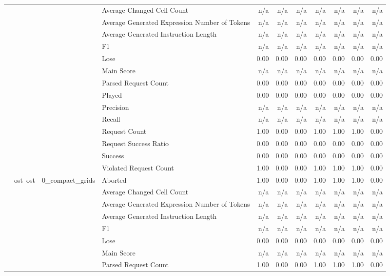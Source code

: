 \begin{tabular}{llllrrrrrrr}
 &  &  & Average Changed Cell Count & n/a & n/a & n/a & n/a & n/a & n/a & n/a \\
 &  &  & Average Generated Expression Number of Tokens & n/a & n/a & n/a & n/a & n/a & n/a & n/a \\
 &  &  & Average Generated Instruction Length & n/a & n/a & n/a & n/a & n/a & n/a & n/a \\
 &  &  & F1 & n/a & n/a & n/a & n/a & n/a & n/a & n/a \\
 &  &  & Lose & 0.00 & 0.00 & 0.00 & 0.00 & 0.00 & 0.00 & 0.00 \\
 &  &  & Main Score & n/a & n/a & n/a & n/a & n/a & n/a & n/a \\
 &  &  & Parsed Request Count & 0.00 & 0.00 & 0.00 & 0.00 & 0.00 & 0.00 & 0.00 \\
 &  &  & Played & 0.00 & 0.00 & 0.00 & 0.00 & 0.00 & 0.00 & 0.00 \\
 &  &  & Precision & n/a & n/a & n/a & n/a & n/a & n/a & n/a \\
 &  &  & Recall & n/a & n/a & n/a & n/a & n/a & n/a & n/a \\
 &  &  & Request Count & 1.00 & 0.00 & 0.00 & 1.00 & 1.00 & 1.00 & 0.00 \\
 &  &  & Request Success Ratio & 0.00 & 0.00 & 0.00 & 0.00 & 0.00 & 0.00 & 0.00 \\
 &  &  & Success & 0.00 & 0.00 & 0.00 & 0.00 & 0.00 & 0.00 & 0.00 \\
 &  &  & Violated Request Count & 1.00 & 0.00 & 0.00 & 1.00 & 1.00 & 1.00 & 0.00 \\
\cline{2-11} \cline{3-11}
 & \multirow[t]{30}{*}{ost--ost} & \multirow[t]{15}{*}{0_compact_grids} & Aborted & 1.00 & 0.00 & 0.00 & 1.00 & 1.00 & 1.00 & 0.00 \\
 &  &  & Average Changed Cell Count & n/a & n/a & n/a & n/a & n/a & n/a & n/a \\
 &  &  & Average Generated Expression Number of Tokens & n/a & n/a & n/a & n/a & n/a & n/a & n/a \\
 &  &  & Average Generated Instruction Length & n/a & n/a & n/a & n/a & n/a & n/a & n/a \\
 &  &  & F1 & n/a & n/a & n/a & n/a & n/a & n/a & n/a \\
 &  &  & Lose & 0.00 & 0.00 & 0.00 & 0.00 & 0.00 & 0.00 & 0.00 \\
 &  &  & Main Score & n/a & n/a & n/a & n/a & n/a & n/a & n/a \\
 &  &  & Parsed Request Count & 1.00 & 0.00 & 0.00 & 1.00 & 1.00 & 1.00 & 0.00 \\

\end{tabular}
